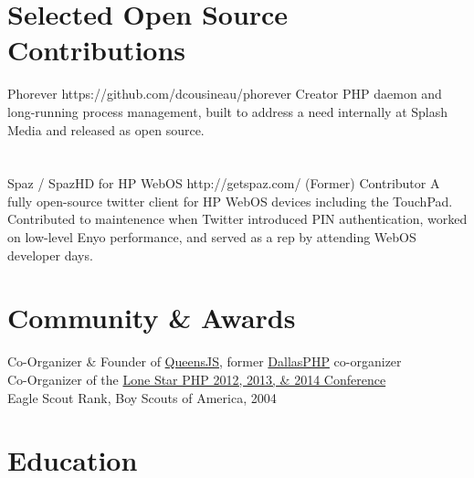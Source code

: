 \documentclass{resume}
\begin{document}
\section{Selected Open Source Contributions}

\project
	{Phorever}
	{https://github.com/dcousineau/phorever}
	{Creator}
	{PHP daemon and long-running process management, built to address a need internally at Splash Media and released as open source.}
\\ \\ \\
\project
	{Spaz / SpazHD for HP WebOS}
	{http://getspaz.com/}
	{\small{(Former)} \normalsize{Contributor}}
	{A fully open-source twitter client for HP WebOS devices including the TouchPad. Contributed to maintenence when Twitter introduced PIN authentication, worked on low-level Enyo performance, and served as a rep by attending WebOS developer days.}


\section{Community \& Awards}

Co-Organizer \& Founder of \href{http://queensjs.com/}{QueensJS}, former \href{http://www.meetup.com/dallasphp/}{DallasPHP} co-organizer
\\
Co-Organizer of the \href{http://lonestarphp.com/}{Lone Star PHP 2012, 2013, \& 2014 Conference}
\\
Eagle Scout Rank, Boy Scouts of America, 2004

\section{Education}

\end{document}

